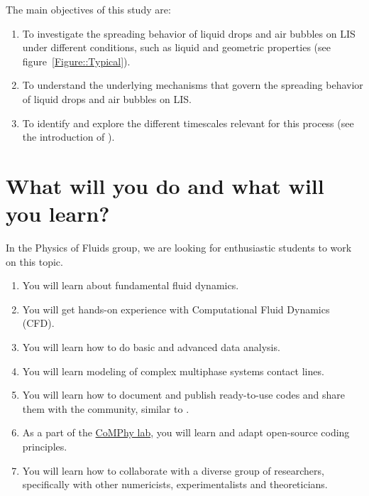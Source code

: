 \documentclass[a4paper,10pt]{article}
\begin{document}
\noindent The main objectives of this study are:

\begin{enumerate}
	\item To investigate the spreading behavior of liquid drops and air bubbles on LIS under different conditions, such as liquid and geometric properties (see figure~\ref{Figure::Typical}). 
	\item To understand the underlying mechanisms that govern the spreading behavior of liquid drops and air bubbles on LIS. 
	\item To identify and explore the different timescales relevant for this process (see the introduction of \citet{VatsalThesis}).
\end{enumerate}

\section*{What will you do and what will you learn?}
In the Physics of Fluids group, we are looking for enthusiastic students to work on this topic.
\begin{enumerate}
\itemsep0em
\item You will learn about fundamental fluid dynamics.
\item You will get hands-on experience with Computational Fluid Dynamics (CFD).
\item You will learn how to do basic and advanced data analysis.
\item You will learn modeling of complex multiphase systems contact lines. 
\item You will learn how to document and publish ready-to-use codes and share them with the community, similar to \citet{basiliskVatsal, basiliskVatsalDropFilm, basiliskVatsalViscousBouncing}. 
\item As a part of the \href{https://comphy-lab.org}{CoMPhy lab}, you will learn and adapt open-source coding principles. 
\item You will learn how to collaborate with a diverse group of researchers, specifically with other numericists, experimentalists and theoreticians.
\end{enumerate}
\end{document}
